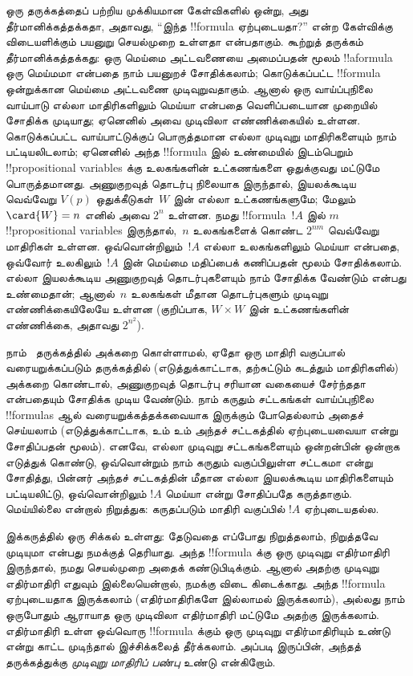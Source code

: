 \documentclass[../../../include/open-logic-section]{subfiles}
\begin{document}


ஒரு தருக்கத்தைப் பற்றிய முக்கியமான கேள்விகளில் ஒன்று, அது
தீர்மானிக்கத்தக்கதா, அதாவது, ``இந்த !!{formula} ஏற்புடையதா?'' என்ற
கேள்விக்கு விடையளிக்கும் பயனுறு செயல்முறை உள்ளதா என்பதாகும். கூற்றுத்
தருக்கம் தீர்மானிக்கத்தக்கது: ஒரு மெய்மை அட்டவணையை அமைப்பதன் மூலம்
!!a{formula} ஒரு மெய்மமா என்பதை நாம் பயனுறச் சோதிக்கலாம்; கொடுக்கப்பட்ட
!!{formula} ஒன்றுக்கான மெய்மை அட்டவணை முடிவுறுவதாகும். ஆனால் ஒரு
வாய்ப்புநிலை வாய்பாடு எல்லா மாதிரிகளிலும் மெய்யா என்பதை வெளிப்படையான
முறையில் சோதிக்க முடியாது; ஏனெனில் அவை முடிவிலா எண்ணிக்கையில் உள்ளன.
கொடுக்கப்பட்ட வாய்பாட்டுக்குப் பொருத்தமான எல்லா முடிவுறு மாதிரிகளையும்
நாம் பட்டியலிடலாம்; ஏனெனில் அந்த !!{formula} இல் உண்மையில் இடம்பெறும்
!!{propositional variable}s க்கு உலகங்களின் உட்கணங்களை ஒதுக்குவது மட்டுமே
பொருத்தமானது. அணுகுறவுத் தொடர்பு நிலையாக இருந்தால், இயலக்கூடிய வெவ்வேறு
$V(p)$ ஒதுக்கீடுகள்~$W$ இன் எல்லா உட்கணங்களுமே; மேலும்
$\card{W} = n$ எனில் அவை $2^n$ உள்ளன. நமது !!{formula}~$!A$ இல்
$m$ !!{propositional variable}s இருந்தால்,~$n$ உலகங்களைக் கொண்ட
$2^{nm}$ வெவ்வேறு மாதிரிகள் உள்ளன. ஒவ்வொன்றிலும்~$!A$ எல்லா உலகங்களிலும்
மெய்யா என்பதை, ஒவ்வோர் உலகிலும்~$!A$ இன் மெய்மை மதிப்பைக் கணிப்பதன் மூலம்
சோதிக்கலாம். எல்லா இயலக்கூடிய அணுகுறவுத் தொடர்புகளையும் நாம் சோதிக்க
வேண்டும் என்பது உண்மைதான்; ஆனால்~$n$ உலகங்கள் மீதான தொடர்புகளும் முடிவுறு
எண்ணிக்கையிலேயே உள்ளன (குறிப்பாக, $W \times W$ இன் உட்கணங்களின்
எண்ணிக்கை, அதாவது $2^{n^2}$).

நாம்~ தருக்கத்தில் அக்கறை கொள்ளாமல், ஏதோ ஒரு மாதிரி வகுப்பால்
வரையறுக்கப்படும் தருக்கத்தில் (எடுத்துக்காட்டாக, தற்சுட்டும் கடத்தும்
மாதிரிகளில்) அக்கறை கொண்டால், அணுகுறவுத் தொடர்பு சரியான வகையைச் சேர்ந்ததா
என்பதையும் சோதிக்க முடிய வேண்டும். நாம் கருதும் சட்டகங்கள் வாய்ப்புநிலை
!!{formula}s ஆல் வரையறுக்கத்தக்கவையாக இருக்கும் போதெல்லாம் அதைச் செய்யலாம்
(எடுத்துக்காட்டாக,  உம்  உம் அந்தச் சட்டகத்தில் ஏற்புடையவையா
என்று சோதிப்பதன் மூலம்). எனவே, எல்லா முடிவுறு சட்டகங்களையும் ஒன்றன்பின்
ஒன்றாக எடுத்துக் கொண்டு, ஒவ்வொன்றும் நாம் கருதும் வகுப்பிலுள்ள சட்டகமா
என்று சோதித்து, பின்னர் அந்தச் சட்டகத்தின் மீதான எல்லா இயலக்கூடிய
மாதிரிகளையும் பட்டியலிட்டு, ஒவ்வொன்றிலும் $!A$ மெய்யா என்று சோதிப்பதே
கருத்தாகும். மெய்யில்லை என்றால் நிறுத்துக: கருதப்படும் மாதிரி வகுப்பில்
$!A$ ஏற்புடையதல்ல.

இக்கருத்தில் ஒரு சிக்கல் உள்ளது: தேடுவதை எப்போது நிறுத்தலாம், நிறுத்தவே
முடியுமா என்பது நமக்குத் தெரியாது. அந்த !!{formula} க்கு ஒரு முடிவுறு
எதிர்மாதிரி இருந்தால், நமது செயல்முறை அதைக் கண்டுபிடிக்கும். ஆனால் அதற்கு
முடிவுறு எதிர்மாதிரி எதுவும் இல்லையென்றால், நமக்கு விடை கிடைக்காது. அந்த
!!{formula} ஏற்புடையதாக இருக்கலாம் (எதிர்மாதிரிகளே இல்லாமல் இருக்கலாம்),
அல்லது நாம் ஒருபோதும் ஆராயாத ஒரு முடிவிலா எதிர்மாதிரி மட்டுமே அதற்கு
இருக்கலாம். எதிர்மாதிரி உள்ள ஒவ்வொரு !!{formula} க்கும் ஒரு முடிவுறு
எதிர்மாதிரியும் உண்டு என்று காட்ட முடிந்தால் இச்சிக்கலைத் தீர்க்கலாம்.
அப்படி இருப்பின், அந்தத் தருக்கத்துக்கு
\emph{முடிவுறு மாதிரிப் பண்பு} உண்டு என்கிறோம்.
\end{document}
